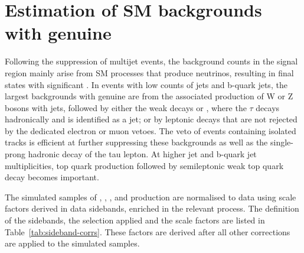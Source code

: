 \section{Estimation of SM backgrounds with genuine \ptvecmiss}
\label{sec:ewk_background}

Following the suppression of multijet events, the background counts in
the signal region mainly arise from SM processes that produce
neutrinos, resulting in final states with significant \ptvecmiss. In
events with low counts of jets and b-quark jets, the largest
backgrounds with genuine \ptvecmiss are from the associated production
of W or Z bosons with jets, followed by either the weak decays \znunu
or \wtaunu, where the $\tau$ decays hadronically and is identified as
a jet; or by leptonic decays that are not rejected by the dedicated
electron or muon vetoes. The veto of events containing isolated tracks
is efficient at further suppressing these backgrounds as well as the
single-prong hadronic decay of the tau lepton. At higher jet and
b-quark jet multiplicities, top quark production followed by
semileptonic weak top quark decay becomes important.


The simulated samples of \gj, \wlj, \zllj, and \ttbar production are
normalised to data using scale factors derived in data sidebands,
enriched in the relevant process. The definition of the sidebands, the
selection applied and the scale factors are listed in
Table~\ref{tab:sideband-corrs}. These factors are derived after all
other corrections are applied to the simulated samples.

